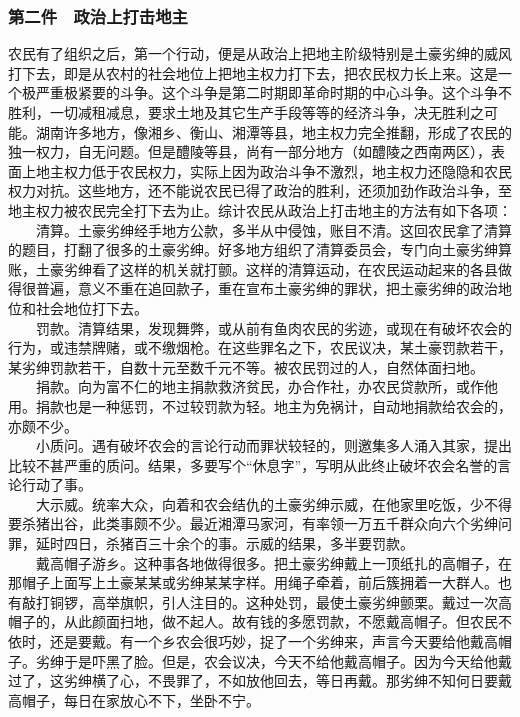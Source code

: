 \documentclass[cn,11pt,chinese]{elegantbook}
\def\myformat#1{\hfil\hfil #1}
\begin{document}
\subsubsection*{\myformat{第二件　政治上打击地主}}
农民有了组织之后，第一个行动，便是从政治上把地主阶级特别是土豪劣绅的威风打下去，即是从农村的社会地位上把地主权力打下去，把农民权力长上来。这是一个极严重极紧要的斗争。这个斗争是第二时期即革命时期的中心斗争。这个斗争不胜利，一切减租减息，要求土地及其它生产手段等等的经济斗争，决无胜利之可能。湖南许多地方，像湘乡、衡山、湘潭等县，地主权力完全推翻，形成了农民的独一权力，自无问题。但是醴陵等县，尚有一部分地方（如醴陵之西南两区），表面上地主权力低于农民权力，实际上因为政治斗争不激烈，地主权力还隐隐和农民权力对抗。这些地方，还不能说农民已得了政治的胜利，还须加劲作政治斗争，至地主权力被农民完全打下去为止。综计农民从政治上打击地主的方法有如下各项：\\
　　清算。土豪劣绅经手地方公款，多半从中侵蚀，账目不清。这回农民拿了清算的题目，打翻了很多的土豪劣绅。好多地方组织了清算委员会，专门向土豪劣绅算账，土豪劣绅看了这样的机关就打颤。这样的清算运动，在农民运动起来的各县做得很普遍，意义不重在追回款子，重在宣布土豪劣绅的罪状，把土豪劣绅的政治地位和社会地位打下去。\\
　　罚款。清算结果，发现舞弊，或从前有鱼肉农民的劣迹，或现在有破坏农会的行为，或违禁牌赌，或不缴烟枪。在这些罪名之下，农民议决，某土豪罚款若干，某劣绅罚款若干，自数十元至数千元不等。被农民罚过的人，自然体面扫地。\\
　　捐款。向为富不仁的地主捐款救济贫民，办合作社，办农民贷款所，或作他用。捐款也是一种惩罚，不过较罚款为轻。地主为免祸计，自动地捐款给农会的，亦颇不少。\\
　　小质问。遇有破坏农会的言论行动而罪状较轻的，则邀集多人涌入其家，提出比较不甚严重的质问。结果，多要写个“休息字”，写明从此终止破坏农会名誉的言论行动了事。\\
　　大示威。统率大众，向着和农会结仇的土豪劣绅示威，在他家里吃饭，少不得要杀猪出谷，此类事颇不少。最近湘潭马家河，有率领一万五千群众向六个劣绅问罪，延时四日，杀猪百三十余个的事。示威的结果，多半要罚款。\\
　　戴高帽子游乡。这种事各地做得很多。把土豪劣绅戴上一顶纸扎的高帽子，在那帽子上面写上土豪某某或劣绅某某字样。用绳子牵着，前后簇拥着一大群人。也有敲打铜锣，高举旗帜，引人注目的。这种处罚，最使土豪劣绅颤栗。戴过一次高帽子的，从此颜面扫地，做不起人。故有钱的多愿罚款，不愿戴高帽子。但农民不依时，还是要戴。有一个乡农会很巧妙，捉了一个劣绅来，声言今天要给他戴高帽子。劣绅于是吓黑了脸。但是，农会议决，今天不给他戴高帽子。因为今天给他戴过了，这劣绅横了心，不畏罪了，不如放他回去，等日再戴。那劣绅不知何日要戴高帽子，每日在家放心不下，坐卧不宁。\\
\end{document}
